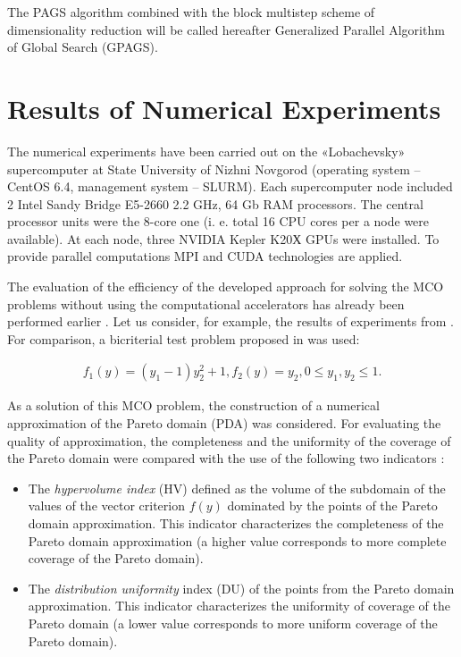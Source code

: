 \documentclass[runningheads]{llncs}
\begin{document}
The PAGS algorithm combined with the block multistep scheme of dimensionality reduction will be called hereafter Generalized Parallel Algorithm of Global Search (GPAGS).

\section{Results of Numerical Experiments}\label{sec:04}

The numerical experiments have been carried out on the «Lobachevsky» supercomputer at State University of Nizhni Novgorod (operating system -- CentOS 6.4, management system -- SLURM). Each supercomputer node included 2 Intel Sandy Bridge E5-2660 2.2 GHz, 64 Gb RAM processors. The central processor units were the 8-core one (i. e. total 16 CPU cores per a node were available). At each node, three NVIDIA Kepler K20Х GPUs were installed. To provide parallel computations MPI and CUDA technologies are applied.

The evaluation of the efficiency of the developed approach for solving the MCO problems without using the computational accelerators has already been performed earlier \cite{c14,c15,c16,c17}. Let us consider, for example, the results of experiments from \cite{c16}. For comparison, a bicriterial test problem proposed in \cite{c41} was used:

\begin{eqnarray} \label{eq:16}
f_1 (y)=(y_1-1) y_2^2+1, f_2 (y)=y_2, 0 \leq y_1,y_2 \leq 1.
\end{eqnarray}

As a solution of this MCO problem, the construction of a numerical approximation of the Pareto domain (PDA) was considered. For evaluating the quality of approximation, the completeness and the uniformity of the coverage of the Pareto domain were compared with the use of the following two indicators \cite{c16,c41}:

\begin{itemize}
\item The \textit{hypervolume index} (HV) defined as the volume of the subdomain of the values of the vector criterion $f(y)$ dominated by the points of the Pareto domain approximation. This indicator characterizes the completeness of the Pareto domain approximation (a higher value corresponds to more complete coverage of the Pareto domain).
\item The \textit{distribution uniformity} index (DU) of the points from the Pareto domain approximation. This indicator characterizes the uniformity of coverage of the Pareto domain (a lower value corresponds to more uniform coverage of the Pareto domain).
\end{itemize}
\end{document}
